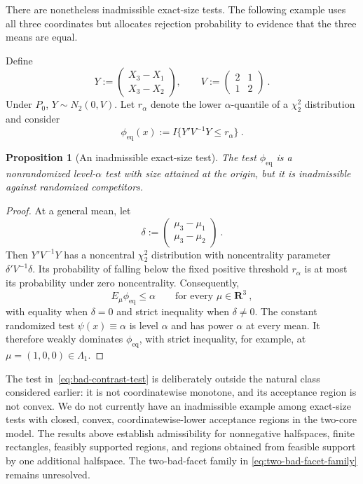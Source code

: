 \documentclass[12pt]{article}
\newtheorem{proposition}{Proposition}
\theoremstyle{remark}
\begin{document}
There are nonetheless inadmissible exact-size tests.  The following example
uses all three coordinates but allocates rejection probability to evidence
that the three means are equal.

Define
\begin{equation}\label{eq:contrast-vector}
Y
:=
\begin{pmatrix}
X_3-X_1\\
X_3-X_2
\end{pmatrix},
\qquad
V
:=
\begin{pmatrix}
2&1\\
1&2
\end{pmatrix}~.
\end{equation}
Under $P_0$, $Y\sim N_2(0,V)$.  Let $r_\alpha$ denote the lower
$\alpha$-quantile of a $\chi^2_2$ distribution and consider
\begin{equation}\label{eq:bad-contrast-test}
\phi_{\mathrm{eq}}(x)
:=
I\{Y'V^{-1}Y\le r_\alpha\}~.
\end{equation}

\begin{proposition}[An inadmissible exact-size test]
\label{prop:inadmissible-contrast-test}
The test $\phi_{\mathrm{eq}}$ is a nonrandomized level-$\alpha$ test with
size attained at the origin, but it is inadmissible against randomized
competitors.
\end{proposition}

\begin{proof}
At a general mean, let
\[
\delta
:=
\begin{pmatrix}
\mu_3-\mu_1\\
\mu_3-\mu_2
\end{pmatrix}~.
\]
Then $Y'V^{-1}Y$ has a noncentral $\chi^2_2$ distribution with noncentrality
parameter $\delta'V^{-1}\delta$.  Its probability of falling below the fixed
positive threshold $r_\alpha$ is at most its probability under zero
noncentrality.  Consequently,
\[
E_\mu\phi_{\mathrm{eq}}\le\alpha
\qquad\text{for every }\mu\in\mathbf R^3~,
\]
with equality when $\delta=0$ and strict inequality when $\delta\ne0$.
The constant randomized test $\psi(x)\equiv\alpha$ is level $\alpha$ and
has power $\alpha$ at every mean.  It therefore weakly dominates
$\phi_{\mathrm{eq}}$, with strict inequality, for example, at
$\mu=(1,0,0)\in\Lambda_1$.
\end{proof}

The test in~\eqref{eq:bad-contrast-test} is deliberately outside the natural
class considered earlier: it is not coordinatewise monotone, and its
acceptance region is not convex.  We do not currently have an inadmissible
example among exact-size tests with closed, convex, coordinatewise-lower
acceptance regions in the two-core model.  The results above establish
admissibility for nonnegative halfspaces, finite rectangles, feasibly
supported regions, and regions obtained from feasible support by one
additional halfspace.  The two-bad-facet family in
\eqref{eq:two-bad-facet-family} remains unresolved.
\end{document}
